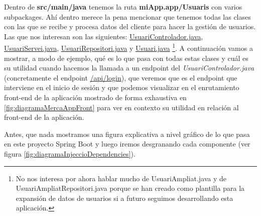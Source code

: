 \documentclass[a4paper,12pt]{report}
\begin{document}
				
				Dentro de \textbf{src/main/java} tenemos la ruta \textbf{miApp.app/Usuaris} con varios subpackages. Ahí dentro merece la pena mencionar que tenemos todas las clases con las que se recibe y procesa datos del cliente para hacer la gestión de usuarios. Las que nos interesan son las siguientes:
				\href{https://github.com/blackcub3s/mercApp/blob/main/APP%20WEB/__springboot__produccio__/app/src/main/java/miApp/app/Usuaris/controlador/UsuariControlador.java}{UsuariControlador.java}, 
				\href{https://github.com/blackcub3s/mercApp/blob/main/APP%20WEB/__springboot__produccio__/app/src/main/java/miApp/app/Usuaris/servei/UsuariServei.java}{UsuariServei.java}, 
				\href{https://github.com/blackcub3s/mercApp/blob/main/APP%20WEB/__springboot__produccio__/app/src/main/java/miApp/app/Usuaris/repositori/UsuariRepositori.java}{UsuariRepositori.java} y 
				\href{https://github.com/blackcub3s/mercApp/blob/main/APP%20WEB/__springboot__produccio__/app/src/main/java/miApp/app/Usuaris/model/Usuari.java}{Usuari.java}
				\footnote{No nos interesa por ahora hablar mucho de UsuariAmpliat.java y de UsuariAmpliatRepositori.java porque se han creado como plantilla para la expansión de datos de usuarios si a futuro seguimos desarrollando esta aplicación.}. 
				A continuación  vamos a mostrar, a modo de ejemplo, qué es lo que pasa con todas estas clases y cuál es su utilidad cuando hacemos la llamada a un endpoint del \textit{UsuariControlador.java} (concretamente el endpoint \href{https://github.com/blackcub3s/mercApp/blob/78c9f573613d94a9d9de6ee046aa5d6f02f0f425/APP%20WEB/__springboot__produccio__/app/src/main/java/miApp/app/Usuaris/controlador/UsuariControlador.java#L103}{/api/login}), que veremos que es el endpoint que interviene en el inicio de sesión y que podemos visualizar en el enrutamiento front-end de la aplicación mostrado de forma exhaustiva en \ref{fig:diagramaMercaAppFront} para ver en contexto su utilidad en relación al front-end de la aplicación.
				
				 Antes, que nada mostramos una figura explicativa a nivel gráfico de lo que pasa en este proyecto Spring Boot y luego iremos desgranando cada componente (ver figura \ref{fig:diagramaInjeccioDependencies}).
				
				
							
\end{document}
